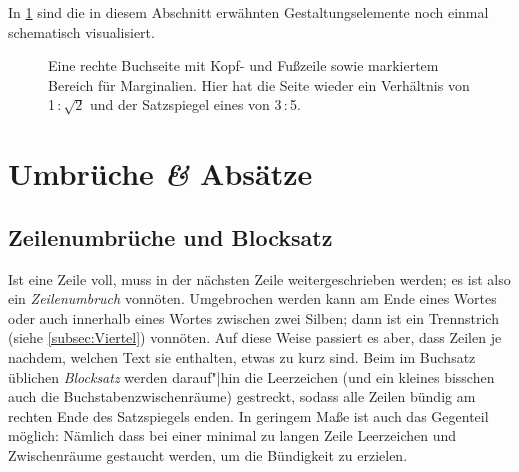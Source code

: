 In \cref{fig:Stege} sind die in diesem Abschnitt erwähnten Gestaltungselemente
noch einmal schematisch visualisiert.

\begin{figure}
  \centering
  \caption{Eine rechte Buchseite mit Kopf- und Fußzeile sowie markiertem Bereich
    für Marginalien. Hier hat die Seite wieder ein Verhältnis von
    1\,:\,$\sqrt{\text{2}}$ und der Satzspiegel eines von 3\,:\,5.}
  \label{fig:Stege}
\end{figure}

\section{Umbrüche \emph{\&} Absätze}

\subsection{Zeilenumbrüche und Blocksatz}
\label{subsec:Blocksatz}

Ist eine Zeile voll, muss in der nächsten Zeile weitergeschrieben werden; es ist
also ein \emph{Zeilenumbruch} vonnöten. Umgebrochen werden kann am Ende eines
Wortes oder auch innerhalb eines Wortes zwischen zwei Silben; dann ist ein
Trennstrich (siehe \cref{subsec:Viertel}) vonnöten. Auf diese Weise passiert es
aber, dass Zeilen je nachdem, welchen Text sie enthalten, etwas zu kurz
sind. Beim im Buchsatz üblichen \emph{Blocksatz} werden darauf"|hin die
Leerzeichen (und ein kleines bisschen auch die Buchstabenzwischenräume)
gestreckt, sodass alle Zeilen bündig am rechten Ende des Satzspiegels enden. In
geringem Maße ist auch das Gegenteil möglich: Nämlich dass bei einer minimal zu
langen Zeile Leerzeichen und Zwischenräume gestaucht werden, um die Bündigkeit
zu erzielen.

